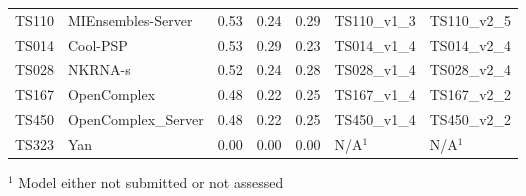 \begin{table}[ht]
{\begin{tabular}{llrrrll}
TS110 & MIEnsembles-Server & 0.53 & 0.24 & 0.29 & TS110\_v1\_3 & TS110\_v2\_5 \\ 
TS014 & Cool-PSP & 0.53 & 0.29 & 0.23 & TS014\_v1\_4 & TS014\_v2\_4 \\ 
TS028 & NKRNA-s & 0.52 & 0.24 & 0.28 & TS028\_v1\_4 & TS028\_v2\_4 \\ 
TS167 & OpenComplex & 0.48 & 0.22 & 0.25 & TS167\_v1\_4 & TS167\_v2\_2 \\ 
TS450 & OpenComplex\_Server & 0.48 & 0.22 & 0.25 & TS450\_v1\_4 & TS450\_v2\_2 \\ 
TS323 & Yan & 0.00 & 0.00 & 0.00 & N/A$^{1}$ & N/A$^{1}$ \\ 
\bottomrule
\end{tabular}%
}
\begin{flushleft}\footnotesize $^{1}$ Model either not submitted or not assessed\end{flushleft}
\end{table}
